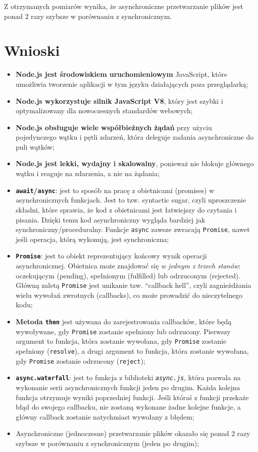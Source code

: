 \documentclass[11pt]{article}
\begin{document}
    Z otrzymanych pomiarów wynika, że asynchroniczne przetwarzanie plików
jest ponad 2 razy szybsze w porównaniu z synchronicznym.

    \hypertarget{wnioski}{%
\section{Wnioski}\label{wnioski}}

\begin{itemize}
\item
  \textbf{Node.js jest środowiskiem uruchomieniowym} JavaScript, które
  umożliwia tworzenie aplikacji w tym języku działających poza
  przeglądarką;
\item
  \textbf{Node.js wykorzystuje silnik JavaScript V8}, który jest szybki
  i optymalizowany dla nowoczesnych standardów webowych;
\item
  \textbf{Node.js obsługuje wiele współbieżnych żądań} przy użyciu
  pojedynczego wątku i pętli zdarzeń, która deleguje zadania
  asynchroniczne do puli wątków;
\item
  \textbf{Node.js jest lekki, wydajny i skalowalny}, ponieważ nie
  blokuje głównego wątku i reaguje na zdarzenia, a nie na żądania;
\item
  \textbf{\texttt{await}/\texttt{async}}: jest to sposób na pracę z
  obietnicami (promises) w asynchronicznych funkcjach. Jest to tzw.
  syntactic sugar, czyli uproszczenie składni, które sprawia, że kod z
  obietnicami jest łatwiejszy do czytania i pisania. Dzięki temu kod
  asynchroniczny wygląda bardziej jak synchroniczny/proceduralny.
  Funkcje \texttt{async} zawsze zwracają \texttt{Promise}, nawet jeśli
  operacja, którą wykonują, jest synchroniczna;
\item
  \textbf{\texttt{Promise}}: jest to obiekt reprezentujący końcowy wynik
  operacji asynchronicznej. Obietnica może znajdować się \emph{w jednym
  z trzech stanów}: oczekującym (pending), spełnionym (fulfilled) lub
  odrzuconym (rejected). Główną zaletą \texttt{Promise} jest unikanie
  tzw. ``callback hell'', czyli zagnieżdżania wielu wywołań zwrotnych
  (callbacks), co może prowadzić do nieczytelnego kodu;
\item
  \textbf{Metoda \texttt{then}} jest używana do zarejestrowania
  callbacków, które będą wywoływane, gdy \texttt{Promise} zostanie
  spełniony lub odrzucony. Pierwszy argument to funkcja, która zostanie
  wywołana, gdy \texttt{Promise} zostanie spełniony (\texttt{resolve}),
  a drugi argument to funkcja, która zostanie wywołana, gdy
  \texttt{Promise} zostanie odrzucony (\texttt{reject});
\item
  \textbf{\texttt{async.waterfall}}: jest to funkcja z biblioteki
  \emph{\texttt{async.js}}, która pozwala na wykonanie serii
  asynchronicznych funkcji jeden po drugim. Każda kolejna funkcja
  otrzymuje wyniki poprzedniej funkcji. Jeśli któraś z funkcji przekaże
  błąd do swojego callbacku, nie zostaną wykonane żadne kolejne funkcje,
  a główny callback zostanie natychmiast wywołany z błędem;
\item
  Asynchroniczne (jednoczesne) przetwarzanie plików okazało się ponad 2
  razy szybsze w porównaniu z synchronicznym (jeden po drugim);
\end{itemize}
\end{document}
